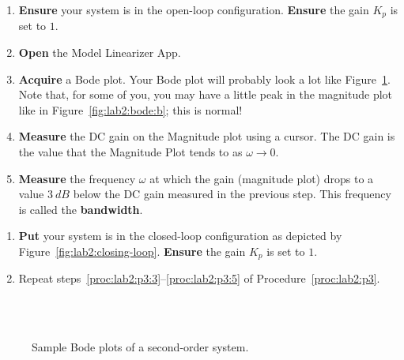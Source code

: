 %
\begin{procedure}[label={proc:lab2:p3}]
  \begin{enumerate}[label=(\arabic*)]
    \item{
      \textbf{Ensure} your system is in the open-loop configuration.
      \textbf{Ensure} the gain \(K_p\) is set to \(1.\)
    }
    \item{
      \textbf{Open} the Model Linearizer App.
    }
    \item{
      \textbf{Acquire} a Bode plot. Your Bode plot will probably look a lot
      like Figure~\ref{fig:lab2:bode}. Note that, for some of you, you may
      have a little peak in the magnitude plot like in
      Figure~\ref{fig:lab2:bode:b}; this is normal!
      \label{proc:lab2:p3:3}
    }
    \item{
      \textbf{Measure} the DC gain on the Magnitude plot using a cursor.
      The DC gain is the value that the Magnitude Plot tends to
      as \(\omega \to 0.\)
    }
    \item{
      \textbf{Measure} the frequency \(\omega\) at which the gain
      (magnitude plot) drops to a value \(\SI{3}{dB}\)
      below the DC gain measured in the previous step. This frequency
      is called the \textbf{bandwidth}.
      \label{proc:lab2:p3:5}
    }
  \end{enumerate}
\end{procedure}
%
\begin{procedure}[label={proc:lab2:p4}]
  \begin{enumerate}[label=(\arabic*)]
    \item{
      \textbf{Put} your system is in the closed-loop configuration as
      depicted by Figure~\ref{fig:lab2:closing-loop}.
      \textbf{Ensure} the gain \(K_p\) is set to \(1.\)
    }
    \item{
      Repeat steps~\ref{proc:lab2:p3:3}--\ref{proc:lab2:p3:5} of
      Procedure~\ref{proc:lab2:p3}.
    }
  \end{enumerate}
\end{procedure}
%
\begin{figure}
  \centering
  \hfill\\
  \hfill\\
  \caption[Sample Bode Plots of a Second-Order System]{
    Sample Bode plots of a second-order system.
  }
  \label{fig:lab2:bode}
\end{figure}

